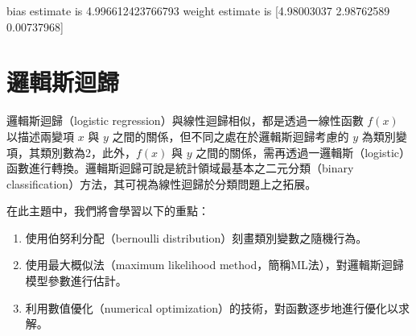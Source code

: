 \documentclass[letterpaper,10pt,english]{sphinxmanual}
\begin{document}
\begin{sphinxVerbatim}[commandchars=\\\{\}]
  
 
 
 
\end{sphinxVerbatim}

\begin{sphinxVerbatim}[commandchars=\\\{\}]
bias estimate is 
 4.996612423766793
weight estimate is 
 [\PYGZhy{}4.98003037  2.98762589 \PYGZhy{}0.00737968]
\end{sphinxVerbatim}


\chapter{邏輯斯迴歸}
\label{\detokenize{notebook/logistic-regression:id1}}\label{\detokenize{notebook/logistic-regression::doc}}
邏輯斯迴歸（logistic regression）與線性迴歸相似，都是透過一線性函數 \(f(x)\) 以描述兩變項 \(x\) 與 \(y\) 之間的關係，但不同之處在於邏輯斯迴歸考慮的 \(y\) 為類別變項，其類別數為2，此外，\(f(x)\) 與 \(y\) 之間的關係，需再透過一邏輯斯（logistic）函數進行轉換。邏輯斯迴歸可說是統計領域最基本之二元分類（binary classification）方法，其可視為線性迴歸於分類問題上之拓展。

在此主題中，我們將會學習以下的重點：
\begin{enumerate}
%
\item {} 
使用伯努利分配（bernoulli distribution）刻畫類別變數之隨機行為。

\item {} 
使用最大概似法（maximum likelihood method，簡稱ML法），對邏輯斯迴歸模型參數進行估計。

\item {} 
利用數值優化（numerical optimization）的技術，對函數逐步地進行優化以求解。

\end{enumerate}
\end{document}
